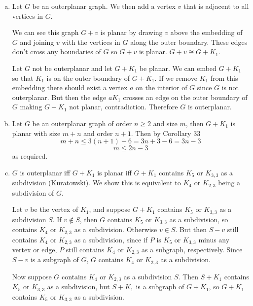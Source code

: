 \begin{enumerate}[(a)]
    \item Let $G$ be an outerplanar graph. We then add a vertex $v$ 
    that is adjacent to all vertices in $G$. 
    
    We can see this graph $G+v$ is planar by drawing $v$
    above the embedding of $G$ and joining $v$ with the vertices in $G$ 
    along the outer boundary. These edges don't cross any boundaries of 
    $G$ so $G+v$ is planar.  $G+v \cong G+K_1$.

    Let $G$ not be outerplanar and let $G+K_1$ be planar. We can embed
    $G+K_1$ so that $K_1$ is on the outer boundary of $G+K_1$.
    If we remove $K_1$ from this embedding there should exist a
    vertex $a$ on the interior of $G$ since $G$ is not outerplanar.
    But then the edge $aK_1$ crosses an edge on the outer boundary
    of $G$ making $G+K_1$ not planar, contradiction. Therefore
    $G$ is outerplanar.

    \item Let $G$ be an outerplanar graph of order $n \ge 2$ and size $m$, 
    then $G+K_1$ is planar with size $m+n$ and order $n+1$. Then
    by Corollary 33 
        $$ m+n \le 3(n+1) - 6 = 3n+3-6 = 3n-3$$
        $$m \le 2n-3$$
        as required.

    \item $G$ is outerplanar iff $G+K_1$ is planar iff $G+K_1$ contains
			$K_5$ or $K_{3,3}$ as a subdivision (Kuratowski). We show
			this is equivalent to $K_4$ or $K_{2,3}$ being a subdivision of
			$G$.

			Let $v$ be the vertex of $K_1$, and suppose $G+K_1$ contains
			$K_5$ or $K_{3,3}$ as a subdivision $S$. If $v \notin S$, then
			$G$ contains $K_5$ or $K_{3,3}$ as a subdivision, so contains
			$K_4$ or $K_{2,3}$ as a subdivision. Otherwise $v \in S$.
			But then $S-v$ still contains $K_4$ or $K_{2,3}$ as a subdivision,
			since if $P$ is $K_5$ or $K_{3,3}$ minus any vertex or edge,
			$P$ still contains $K_4$ or $K_{2,3}$ as a subgraph, respectively.
			Since $S-v$ is a subgraph of $G$, $G$ contains $K_4$ or $K_{2,3}$ as
			a subdivision.

			Now suppose $G$ contains $K_4$ or $K_{2,3}$ as a subdivision $S$.
			Then $S+K_1$ contains $K_5$ or $K_{3,3}$ as a subdivision, but
			$S+K_1$ is a subgraph of $G+K_1$, so $G+K_1$ contains $K_5$ or 
			$K_{3,3}$ as a subdivision.
\end{enumerate}
